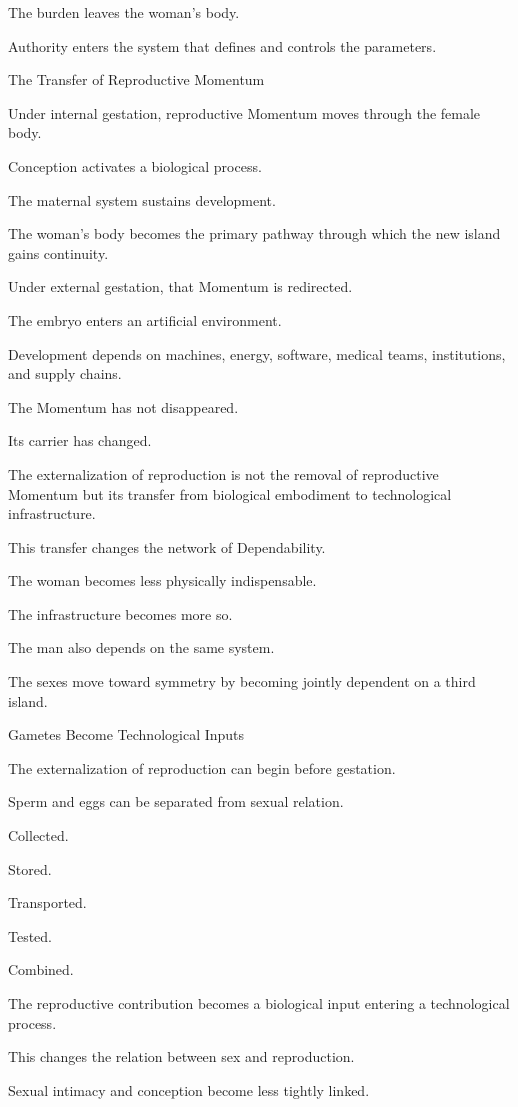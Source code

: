 The burden leaves the woman’s body.

Authority enters the system that defines and controls the parameters.

The Transfer of Reproductive Momentum

Under internal gestation, reproductive Momentum moves through the female body.

Conception activates a biological process.

The maternal system sustains development.

The woman’s body becomes the primary pathway through which the new island gains continuity.

Under external gestation, that Momentum is redirected.

The embryo enters an artificial environment.

Development depends on machines, energy, software, medical teams, institutions, and supply chains.

The Momentum has not disappeared.

Its carrier has changed.

The externalization of reproduction is not the removal of reproductive Momentum but its transfer from biological embodiment to technological infrastructure.

This transfer changes the network of Dependability.

The woman becomes less physically indispensable.

The infrastructure becomes more so.

The man also depends on the same system.

The sexes move toward symmetry by becoming jointly dependent on a third island.

Gametes Become Technological Inputs

The externalization of reproduction can begin before gestation.

Sperm and eggs can be separated from sexual relation.

Collected.

Stored.

Transported.

Tested.

Combined.

The reproductive contribution becomes a biological input entering a technological process.

This changes the relation between sex and reproduction.

Sexual intimacy and conception become less tightly linked.

